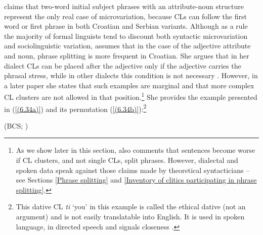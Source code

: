 \noindent \citet[112]{RadanovicKocic88} claims that two-word initial subject phrases with an attribute-noun structure represent the only real case of microvariation, because CLs can follow the first word or first phrase in both Croatian and Serbian variants. Although as a rule the majority of formal linguists tend to discount both syntactic microvariation and sociolinguistic variation, \citet[135]{RadanovicKocic88} assumes that in the case of the adjective attribute and noun, phrase splitting is more frequent in Croatian. She argues that in her dialect CLs can be placed after the adjective only if the adjective carries the phrasal stress, while in other dialects this condition is not necessary \citep[cf.][134]{RadanovicKocic88}. However, in a later paper \citep[435]{RadanovicKocic96} she states that such examples are marginal and that more complex CL clusters are not allowed in that position.\footnote{As we show later in this section, \citet{Progovac96} also comments that sentences become worse if CL clusters, and not single CLs, split phrases. However, dialectal and spoken data speak against those claims made by theoretical syntacticians – see Sections \ref{Phrase splitting} and \ref{Inventory of clitics participating in phrase splitting}.} She provides the example presented in (\ref{(6.34a)}) and its permutation (\ref{(6.34b)}):\footnote{This dative CL \textit{ti} ‘you’ in this example is called the ethical dative (not an argument) and is not easily translatable into English. It is used in spoken language, in directed speech and signals closeness  \citep[220]{SilicPranjkovic07}.}

\begin{exe}\ex\begin{xlist}
\strut\hfill (BCS; \citealt[435]{RadanovicKocic96})
\end{xlist}
\end{exe}



